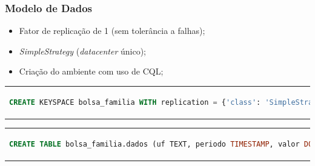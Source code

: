 \documentclass[brazil]{beamer}
\begin{document}
\begin{frame}[fragile]
	\frametitle{Modelo de Dados}
	\begin{itemize}
		\item Fator de replicação de 1 (sem tolerância a falhas);
		\item \emph{SimpleStrategy} (\emph{datacenter} único);
		\item Criação do ambiente com uso de CQL;
	\end{itemize}

	\begin{tabular}{c}
	\begin{lstlisting}[caption={Código CQL para criação do keyspace},label={lst:cql_create_table},language=SQL]
	CREATE KEYSPACE bolsa_familia WITH replication = {'class': 'SimpleStrategy', 'replication_factor': 1};
	\end{lstlisting}
	\end{tabular}

	\begin{tabular}{c}
	\begin{lstlisting}[caption={Código CQL para criação da tabela},label={lst:cql_create_table},language=SQL]
		CREATE TABLE bolsa_familia.dados (uf TEXT, periodo TIMESTAMP, valor DOUBLE, nis_favorecido BIGINT, cod_municipio INT, fonte TEXT, nome_favorecido TEXT, nome_municipio TEXT, PRIMARY KEY(nis_favorecido, periodo, valor));
	\end{lstlisting}
	\end{tabular}

\end{frame}
\end{document}

